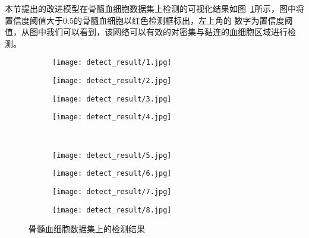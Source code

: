 本节提出的改进模型在骨髓血细胞数据集上检测的可视化结果如图~\ref{fig:detect_res}所示，图中将置信度阈值大于0.5的骨髓血细胞以红色检测框标出，左上角的
数字为置信度阈值，从图中我们可以看到，该网络可以有效的对密集与黏连的血细胞区域进行检测。
\begin{figure}[htbp]
	\centering
  \begin{subfigure}{0.24\linewidth}
    \centering
    \texttt{[image: detect\_result/1.jpg]}
  \end{subfigure}
	\centering
  \begin{subfigure}{0.24\linewidth}
    \centering
    \texttt{[image: detect\_result/2.jpg]}
  \end{subfigure}
		\centering
  \begin{subfigure}{0.24\linewidth}
    \centering
    \texttt{[image: detect\_result/3.jpg]}
  \end{subfigure}
		\centering
  \begin{subfigure}{0.24\linewidth}
    \centering
    \texttt{[image: detect\_result/4.jpg]}
  \end{subfigure}
\\	
\vspace{0.2cm}
	\centering
  \begin{subfigure}{0.24\linewidth}
    \centering
    \texttt{[image: detect\_result/5.jpg]}
  \end{subfigure}
		\centering
  \begin{subfigure}{0.24\linewidth}
    \centering
    \texttt{[image: detect\_result/6.jpg]}
  \end{subfigure}
		\centering
  \begin{subfigure}{0.24\linewidth}
    \centering
    \texttt{[image: detect\_result/7.jpg]}
  \end{subfigure}
		\centering
  \begin{subfigure}{0.24\linewidth}
    \centering
    \texttt{[image: detect\_result/8.jpg]}
  \end{subfigure}
  \caption{骨髓血细胞数据集上的检测结果}
	\label{fig:detect_res}
\end{figure}

